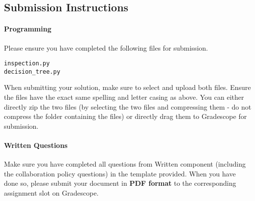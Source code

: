 \documentclass[11pt,addpoints,answers]{exam}
\begin{document}
\subsection{Submission Instructions}

\paragraph{Programming}
Please ensure you have completed the following files for submission.


\begin{verbatim}
inspection.py
decision_tree.py
\end{verbatim}

When submitting your solution, make sure to select and upload both files. Ensure the files have the exact same spelling and letter casing as above. You can either directly zip the two files (by selecting the two files and compressing them - do not compress the folder containing the files) or directly drag them to Gradescope for submission.


\paragraph{Written Questions}
Make sure you have completed all questions from Written component (including the collaboration policy questions) in the template provided.  When you have done so, please submit your document in \textbf{PDF format} to the corresponding assignment slot on Gradescope.



\newpage
\end{document}
